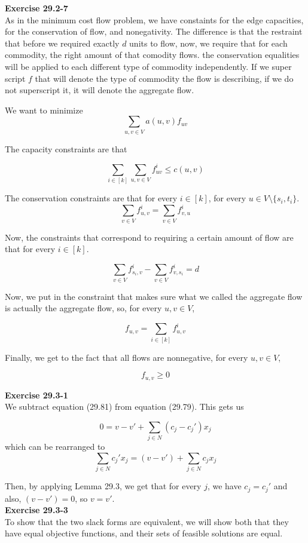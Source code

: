 \documentclass{article}
\begin{document}
\noindent\textbf{Exercise 29.2-7}\\
As in the minimum cost flow problem, we have constaints for the edge capacities, for the conservation of flow, and nonegativity. The difference is that the restraint that before we required exactly $d$ units to flow, now, we require that for each commodity, the right amount of that comodity flows. the conservation equalities will be applied to each different type of commodity independently. If we super script $f$ that will denote the type of commodity the flow is describing, if we do not superscript it, it will denote the aggregate flow.

We want to minimize
\[
\sum_{u,v\in V}a(u,v) f_{uv}
\]

The capacity constraints are that

\[
\sum_{i\in [k]} \sum_{u,v \in V} f_{uv}^i \le c(u,v)
\]

The conservation constraints are that for every $i\in [k]$, for every $u\in V\setminus\{s_i,t_i\}$.
\[
\sum_{v\in V} f_{u,v}^i = \sum_{v\in V} f_{v,u}^i
\]

Now, the constraints that correspond to requiring a certain amount of flow are that for every $i\in [k]$.

\[
\sum_{v\in V} f_{s_i,v}^i -\sum_{v\in V} f_{v,s_i}^i = d
\]

Now, we put in the constraint that makes sure what we called the aggregate flow is actually the aggregate flow, so, for every $u,v\in V$,

\[
f_{u,v} = \sum_{i\in[k]} f_{u,v}^i
\]

Finally, we get to the fact that all flows are nonnegative, for every $u,v\in V$,

\[
f_{u,v} \ge 0
\]

\noindent\textbf{Exercise 29.3-1}\\
We subtract equation (29.81) from equation (29.79). This gets us

\[
0 = v - v' + \sum_{j\in N} (c_j - c_j') x_j
\]
which can be rearranged to
\[
\sum_{j\in N} c_j' x_j = (v-v') + \sum_{j\in N} c_j x_j
\]

Then, by applying Lemma 29.3, we get that for every $j$, we have $c_j = c_j'$ and also, $(v-v')=0$, so $v= v'$.\\


\noindent\textbf{Exercise 29.3-3}\\
To show that the two slack forms are equivalent, we will show both that they have equal objective functions, and their sets of feasible solutions are equal.
\end{document}
